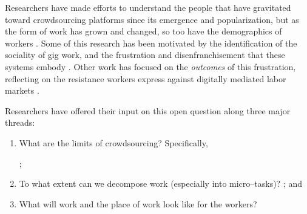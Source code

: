 \documentclass[trackingWork]{subfiles}
\begin{document}
Researchers have made efforts to understand the people
that have gravitated toward crowdsourcing platforms
since its emergence and popularization,
but as the form of work has grown and changed, so too have the demographics of workers
\cite{Ross,whoareNOTtheTurkers}.
Some of this research has been motivated by the identification of the sociality of gig work,
and the frustration and disenfranchisement that these systems embody
\cite{turkopticon,dynamo}.
Other work has focused on the \textit{outcomes} of this frustration,
reflecting on the resistance workers express against digitally mediated labor markets
\cite{uberAlgorithm}.

Researchers have offered their input on this open question along three major threads:
\begin{enumerate}
  \item What are the limits of crowdsourcing?
        Specifically,
        \cite{foundry,suzukiAtelier,KimStoria,yuanAlmost,YuEncouragingOutside,
              Nebeling:2016:WCW:2858036.2858169,
              Hahn:2016:KAB:2858036.2858364};
  \item To what extent can we decompose work (especially into micro--tasks)? 
        \cite{embracingErrorKrishna,bernsteinSoylent,sensitiveTasks,
              LykourentzouPersonalityMatters,KucherbaevReLauncher,
              Law:2016:CKC:2858036.2858144,Cai:2016:CRI:2858036.2858237,
              Chang:2016:ACC:2858036.2858411,Newell:2016:OMA:2858036.2858490}; and%
  \item What will work and the place of work look like for the workers?
        \cite{turkopticon,storiesIraniSilberman,dynamo,crowdcollab,
              whyWouldAnyoneBrewer,takingAHITMcInnis}
\end{enumerate}
\end{document}

